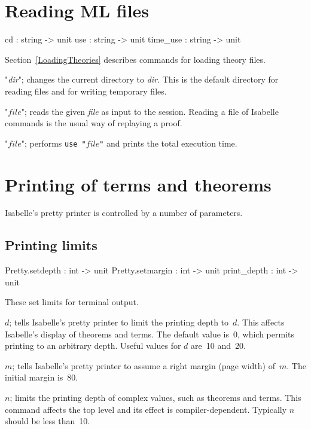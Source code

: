 \section{Reading ML files}
\begin{ttbox} 
cd              : string -> unit
use             : string -> unit
time_use        : string -> unit
\end{ttbox}
Section~\ref{LoadingTheories} describes commands for loading theory files.
\begin{ttdescription}
\item[\ttindexbold{cd} "{\it dir}";]
  changes the current directory to {\it dir}.  This is the default directory
  for reading files and for writing temporary files.

\item[\ttindexbold{use} "$file$";]  
reads the given {\it file} as input to the \ML{} session.  Reading a file
of Isabelle commands is the usual way of replaying a proof.

\item[\ttindexbold{time_use} "$file$";]  
performs {\tt use~"$file$"} and prints the total execution time.
\end{ttdescription}


\section{Printing of terms and theorems}
Isabelle's pretty printer is controlled by a number of parameters.

\subsection{Printing limits}
\begin{ttbox} 
Pretty.setdepth  : int -> unit
Pretty.setmargin : int -> unit
print_depth      : int -> unit
\end{ttbox}
These set limits for terminal output.

\begin{ttdescription}
\item[\ttindexbold{Pretty.setdepth} \(d\);]  
  tells Isabelle's pretty printer to limit the printing depth to~$d$.  This
  affects Isabelle's display of theorems and terms.  The default value
  is~0, which permits printing to an arbitrary depth.  Useful values for
  $d$ are~10 and~20.

\item[\ttindexbold{Pretty.setmargin} \(m\);]  
  tells Isabelle's pretty printer to assume a right margin (page width)
  of~$m$.  The initial margin is~80.

\item[\ttindexbold{print_depth} \(n\);]  
  limits the printing depth of complex \ML{} values, such as theorems and
  terms.  This command affects the \ML{} top level and its effect is
  compiler-dependent.  Typically $n$ should be less than~10.
\end{ttdescription}


